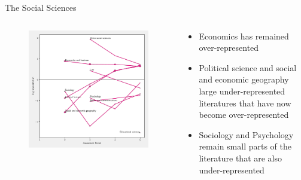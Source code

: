 \documentclass[9pt]{beamer}
\begin{document}
\begin{frame}{The Social Sciences}
\begin{columns}
	\begin{column}{0.618\linewidth}
		\begin{figure}
			\includegraphics[width=\linewidth]{../plots/ipcc_representation/ipcc_rep_cats_time_Social_Sciences.pdf}
		\end{figure}
	\end{column}
	\begin{column}{0.382\linewidth}
		\begin{itemize}
			\item<1->  Economics has remained over-represented
			\item<2-> Political science and social and economic geography large under-represented literatures that have now become over-represented
			\item<3-> Sociology and Psychology remain small parts of the literature that are also under-represented
			
		\end{itemize}
	\end{column}
\end{columns}
\end{frame}

\end{document}
